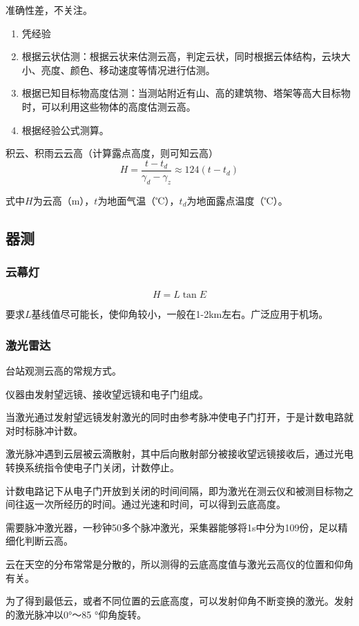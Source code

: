 \documentclass[UTF8,11pt]{ctexbook}
\begin{document}
准确性差，不关注。
\begin{enumerate}
    \item 凭经验
    \item 根据云状估测：根据云状来估测云高，判定云状，同时根据云体结构，云块大小、亮度、颜色、移动速度等情况进行估测。
    \item 根据已知目标物高度估测：当测站附近有山、高的建筑物、塔架等高大目标物时，可以利用这些物体的高度估测云高。
    \item 根据经验公式测算。
\end{enumerate}

积云、积雨云云高（计算露点高度，则可知云高）
\[
H=\frac{t-t_d}{\gamma_d-\gamma_z}\approx124(t-t_d)
\]

式中\(H\)为云高（m），\(t\)为地面气温（℃），\(t_d\)为地面露点温度（℃）。 

\subsection{器测}

\subsubsection{云幕灯}
\[
H=L\tan E
\]

要求\(L\)基线值尽可能长，使仰角较小，一般在1-2km左右。广泛应用于机场。

\subsubsection{激光雷达}

台站观测云高的常规方式。

仪器由发射望远镜、接收望远镜和电子门组成。

当激光通过发射望远镜发射激光的同时由参考脉冲使电子门打开，于是计数电路就对时标脉冲计数。

激光脉冲遇到云层被云滴散射，其中后向散射部分被接收望远镜接收后，通过光电转换系统指令使电子门关闭，计数停止。

计数电路记下从电子门开放到关闭的时间间隔，即为激光在测云仪和被测目标物之间往返一次所经历的时间。通过光速和时间，可以得到云底高度。 

需要脉冲激光器，一秒钟50多个脉冲激光，采集器能够将1s中分为109份，足以精细化判断云高。

云在天空的分布常常是分散的，所以测得的云底高度值与激光云高仪的位置和仰角有关。

为了得到最低云，或者不同位置的云底高度，可以发射仰角不断变换的激光。发射的激光脉冲以0°～85 °仰角旋转。
\end{document}
